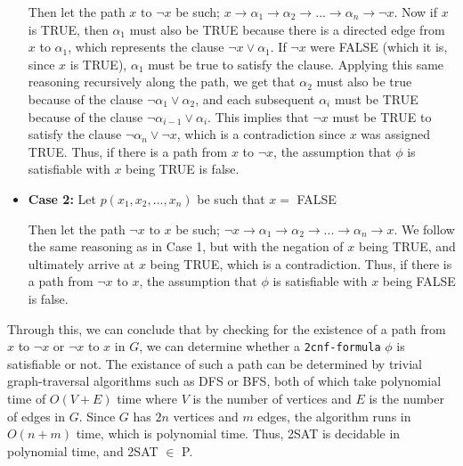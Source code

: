 \documentclass[addpoints,a4paper]{exam}
\begin{document}
\begin{questions}
\begin{solution}
\begin{itemize}
      Then let the path $ x \text{ to } \neg x $ be such; $ x \to \alpha_1 \to \alpha_2 \to ... \to \alpha_n \to \neg x $. Now if $x$ is TRUE, then $\alpha_1$ must also be TRUE because there is a directed edge from $x$ to $\alpha_1$, which represents the clause $ \neg x \vee \alpha_1 $. If $ \neg x $ were FALSE (which it is, since $x$ is TRUE), $ \alpha_1 $ must be true to satisfy the clause. Applying this same reasoning recursively along the path, we get that $ \alpha_2 $ must also be true because of the clause $ \neg \alpha_1 \vee \alpha_2 $, and each subsequent $ \alpha_i $ must be TRUE because of the clause $ \neg \alpha_{i - 1} \vee \alpha_i $. This implies that $ \neg x $ must be TRUE to satisfy the clause $ \neg \alpha_n \vee \neg x $, which is a contradiction since $x$ was assigned TRUE. Thus, if there is a path from $x$ to $\neg x$, the assumption that $\phi$ is satisfiable with $x$ being TRUE is false.

      \item[] \textbf{Case 2:} Let $ p(x_1, x_2, ..., x_n) $ be such that $ x = $ FALSE

      Then let the path $ \neg x \text{ to } x $ be such; $ \neg x \to \alpha_1 \to \alpha_2 \to ... \to \alpha_n \to x $. 
      We follow the same reasoning as in Case 1, but with the negation of $x$ being TRUE, and ultimately arrive at $x$ being TRUE, which is a contradiction. Thus, if there is a path from $ \neg x $ to $x$, the assumption that $\phi$ is satisfiable with $x$ being FALSE is false.
    \end{itemize}

    Through this, we can conclude that by checking for the existence of a path from $x$ to $ \neg x $ or $ \neg x $ to $x$ in $G$, we can determine whether a \texttt{2cnf-formula} $\phi$ is satisfiable or not. The existance of such a path can be determined by trivial graph-traversal algorithms such as DFS or BFS, both of which take polynomial time of $ O(V + E) $ time where $V$ is the number of vertices and $E$ is the number of edges in $G$. Since $G$ has $2n$ vertices and $m$ edges, the algorithm runs in $ O(n + m) $ time, which is polynomial time. Thus, 2SAT is decidable in polynomial time, and 2SAT $\in$ P.


\end{solution}
\end{questions}
\end{document}

